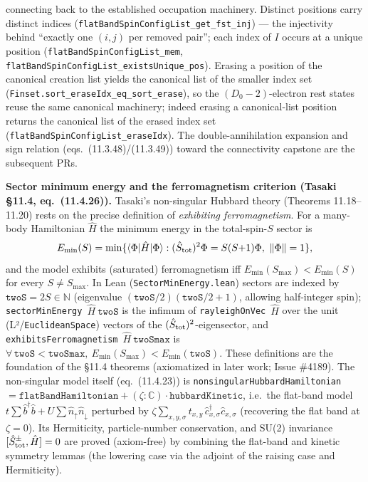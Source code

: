 \documentclass[a4paper,11pt]{article}
\begin{document}
connecting back to the established occupation machinery.  Distinct positions carry distinct indices (\texttt{flatBandSpinConfigList\_get\_fst\_inj}) --- the injectivity behind \textquotedblleft exactly one $(i,j)$ per removed pair\textquotedblright; each index of $I$ occurs at a unique position (\texttt{flatBandSpinConfigList\_mem}, \texttt{flatBandSpinConfigList\_existsUnique\_pos}).  Erasing a position of the canonical creation list yields the canonical list of the smaller index set (\texttt{Finset.sort\_eraseIdx\_eq\_sort\_erase}), so the $(D_0-2)$-electron rest states reuse the same canonical machinery; indeed erasing a canonical-list position returns the canonical list of the erased index set (\texttt{flatBandSpinConfigList\_eraseIdx}).  The double-annihilation expansion and sign relation
(eqs.~(11.3.48)/(11.3.49)) toward the connectivity capstone are the subsequent PRs.

\medskip\noindent\textbf{Sector minimum energy and the ferromagnetism criterion (Tasaki
§11.4, eq.~(11.4.26)).}  Tasaki's non-singular Hubbard theory (Theorems 11.18--11.20) rests
on the precise definition of \emph{exhibiting ferromagnetism}.  For a many-body Hamiltonian
$\hat H$ the minimum energy in the total-spin-$S$ sector is
\[
  E_{\min}(S) = \min\{\langle\Phi|\hat H|\Phi\rangle : (\hat S_{\rm tot})^2\Phi = S(S{+}1)\Phi,\ \|\Phi\|=1\},
\]
and the model exhibits (saturated) ferromagnetism iff $E_{\min}(S_{\max}) < E_{\min}(S)$ for
every $S\ne S_{\max}$.  In Lean (\texttt{SectorMinEnergy.lean}) sectors are indexed by
$\mathtt{twoS}=2S\in\mathbb N$ (eigenvalue $(\mathtt{twoS}/2)(\mathtt{twoS}/2+1)$, allowing
half-integer spin); \texttt{sectorMinEnergy}~$\hat H~\mathtt{twoS}$ is the infimum of
\texttt{rayleighOnVec}~$\hat H$ over the unit (L²/\texttt{EuclideanSpace}) vectors of the
$(\hat S_{\rm tot})^2$-eigensector, and \texttt{exhibitsFerromagnetism}~$\hat H~\mathtt{twoSmax}$
is $\forall\,\mathtt{twoS}<\mathtt{twoSmax},\ E_{\min}(S_{\max})<E_{\min}(\mathtt{twoS})$.  These
definitions are the foundation of the §11.4 theorems (axiomatized in later work; Issue \#4189).
The non-singular model itself (eq.~(11.4.23)) is \texttt{nonsingularHubbardHamiltonian} $=
\texttt{flatBandHamiltonian} + (\zeta:\mathbb C)\cdot\texttt{hubbardKinetic}$, i.e.\ the flat-band
model $t\sum\hat b^\dagger\hat b + U\sum\hat n_\uparrow\hat n_\downarrow$ perturbed by
$\zeta\sum_{x,y,\sigma} t_{x,y}\,\hat c^\dagger_{x,\sigma}\hat c_{x,\sigma}$ (recovering the flat
band at $\zeta=0$).  Its Hermiticity, particle-number conservation, and SU(2) invariance
$[\hat S^\pm_{\rm tot},\hat H]=0$ are proved (axiom-free) by combining the flat-band and kinetic
symmetry lemmas (the lowering case via the adjoint of the raising case and Hermiticity).
\end{document}
